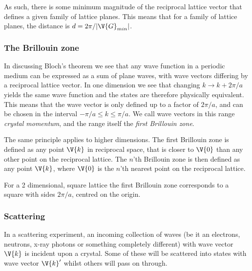 \documentclass[main.tex]{subfiles}
\begin{document}
	As such, there is some minimum magnitude of the reciprocal lattice vector that defines a given family of lattice planes. This means that for a family of lattice planes, the distance is $ d = 2\pi /| \V{G}_{min}| $.
	
	\subsubsection{The Brillouin zone}
	In discussing Bloch's theorem we see that any wave function in a periodic medium can be expressed as a sum of plane waves, with wave vectors differing by a reciprocal lattice vector. In one dimension we see that changing $ k \to k + 2\pi/a $ yields the same wave function and the states are therefore physically equivalent. This means that the wave vector is only defined up to a factor of $ 2 \pi / a $, and can be chosen in the interval $ -\pi /a \leq k \leq \pi/a $. We call wave vectors in this range \textit{crystal momentum}, and the range itself the \textit{first Brillouin zone}.
	
	The same principle applies to higher dimensions. The first Brillouin zone is defined as any point $ \V{k} $ in reciprocal space, that is closer to $ \V{0} $ than any other point on the reciprocal lattice. The $ n $'th Brillouin zone is then defined as any point $ \V{k} $, where $ \V{0} $ is the $ n $'th nearest point on the reciprocal lattice.
	
	For a 2 dimensional, square lattice the first Brillouin zone corresponds to a square with sides $ 2\pi /a $, centred on the origin.
	
	\subsubsection{Scattering}
	In a scattering experiment, an incoming collection of waves (be it an electrons, neutrons, x-ray photons or something completely different) with wave vector $ \V{k} $ is incident upon a crystal. Some of these will be scattered into states with wave vector $ \V{k}' $ whilst others will pass on through. 
	
\end{document}

